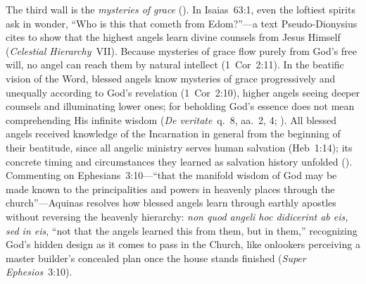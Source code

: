 The third wall is the \emph{mysteries of grace} (). In Isaias~63:1, even the loftiest spirits ask in wonder, ``Who is this that cometh from Edom?''---a text Pseudo-Dionysius cites to show that the highest angels learn divine counsels from Jesus Himself (\emph{Celestial Hierarchy}~VII). Because mysteries of grace flow purely from God's free will, no angel can reach them by natural intellect (1~Cor~2:11). In the beatific vision of the Word, blessed angels know mysteries of grace progressively and unequally according to God's revelation (1~Cor~2:10), higher angels seeing deeper counsels and illuminating lower ones; for beholding God's essence does not mean comprehending His infinite wisdom (\emph{De veritate}~q.~8, aa.~2, 4; ). All blessed angels received knowledge of the Incarnation in general from the beginning of their beatitude, since all angelic ministry serves human salvation (Heb~1:14); its concrete timing and circumstances they learned as salvation history unfolded (). Commenting on Ephesians~3:10---``that the manifold wisdom of God may be made known to the principalities and powers in heavenly places through the church''---Aquinas resolves how blessed angels learn through earthly apostles without reversing the heavenly hierarchy: \emph{non quod angeli hoc didicerint ab eis, sed in eis}, ``not that the angels learned this from them, but in them,'' recognizing God's hidden design as it comes to pass in the Church, like onlookers perceiving a master builder's concealed plan once the house stands finished (\emph{Super Ephesios}~3:10).



